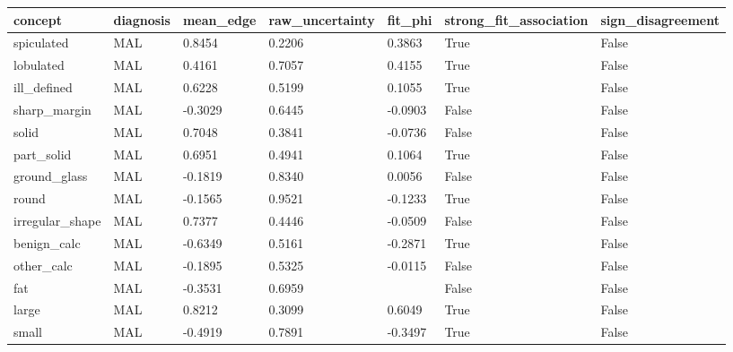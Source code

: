 \begin{tabular}{lllllll}
\hline
concept & diagnosis & mean\_edge & raw\_uncertainty & fit\_phi & strong\_fit\_association & sign\_disagreement \\
\hline
spiculated & MAL & 0.8454 & 0.2206 & 0.3863 & True & False \\
lobulated & MAL & 0.4161 & 0.7057 & 0.4155 & True & False \\
ill\_defined & MAL & 0.6228 & 0.5199 & 0.1055 & True & False \\
sharp\_margin & MAL & -0.3029 & 0.6445 & -0.0903 & False & False \\
solid & MAL & 0.7048 & 0.3841 & -0.0736 & False & False \\
part\_solid & MAL & 0.6951 & 0.4941 & 0.1064 & True & False \\
ground\_glass & MAL & -0.1819 & 0.8340 & 0.0056 & False & False \\
round & MAL & -0.1565 & 0.9521 & -0.1233 & True & False \\
irregular\_shape & MAL & 0.7377 & 0.4446 & -0.0509 & False & False \\
benign\_calc & MAL & -0.6349 & 0.5161 & -0.2871 & True & False \\
other\_calc & MAL & -0.1895 & 0.5325 & -0.0115 & False & False \\
fat & MAL & -0.3531 & 0.6959 &  & False & False \\
large & MAL & 0.8212 & 0.3099 & 0.6049 & True & False \\
small & MAL & -0.4919 & 0.7891 & -0.3497 & True & False \\
\hline
\end{tabular}
